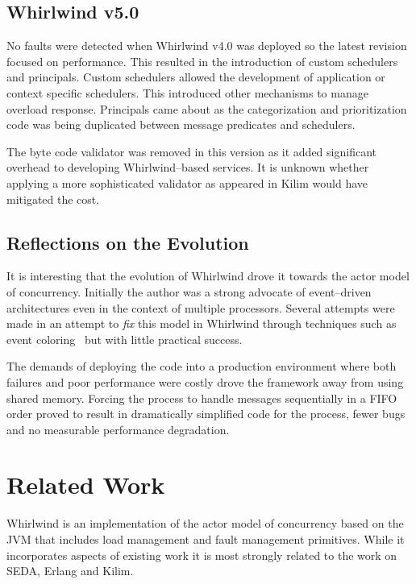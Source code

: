 \documentclass[conference]{IEEEtran}
\begin{document}
\subsection{Whirlwind v5.0}

No faults were detected when Whirlwind v4.0 was deployed so the latest revision focused on performance. This resulted in the introduction of custom schedulers and principals. Custom schedulers allowed the development of application or context specific schedulers. This introduced other mechanisms to manage overload response. Principals came about as the categorization and prioritization code was being duplicated between message predicates and schedulers.

The byte code validator was removed in this version as it added significant overhead to developing Whirlwind--based services. It is unknown whether applying a more sophisticated validator as appeared in Kilim would have mitigated the cost.

\subsection{Reflections on the Evolution}

It is interesting that the evolution of Whirlwind drove it towards the actor model of concurrency. Initially the author was a strong advocate of event--driven architectures even in the context of multiple processors. Several attempts were made in an attempt to \emph{fix} this model in Whirlwind through techniques such as event coloring~\cite{Dabek02EventDriven} but with little practical success. 

The demands of deploying the code into a production environment where both failures and poor performance were costly drove the framework away from using shared memory. Forcing the process to handle messages sequentially in a FIFO order proved to result in dramatically simplified code for the process, fewer bugs and no measurable performance degradation.

\section{Related Work}

Whirlwind is an implementation of the actor model of concurrency based on the JVM that includes load management and fault management primitives. While it incorporates aspects of existing work it is most strongly related to the work on SEDA, Erlang and Kilim. 
\end{document}
